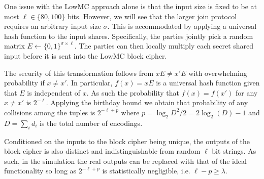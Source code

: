 One issue with the LowMC approach alone is that the input size is fixed to be at most $\ell\in\{80,100\}$ bits. However, we will see that the larger join protocol requires an arbitrary input size $\sigma$. This is accommodated by applying a universal hash function to the input shares. Specifically, the parties jointly pick a random matrix $E\gets\{0,1\}^{\sigma\times \ell}$. The parties can then locally multiply each secret shared input before it is sent into the LowMC block cipher.

The security of this transformation follows from $xE\neq x'E$ with overwhelming probability if $x\neq x'$. In particular, $f(x)=xE$ is a universal hash function given that $E$ is independent of $x$. As such the probability that $f(x)=f(x')$ for any $x\neq x'$  is $2^{-\ell}$. Applying the birthday bound we obtain that probability of any collisions among the tuples is $2^{-\ell+p}$ where $p=\log_2 D^2/2=2\log_2(D)-1$ and $D=\sum_i d_i$ is the total number of encodings.

Conditioned on the inputs to the block cipher being unique, the outputs of the block cipher is also distinct and indistinguishable from random $\ell$ bit strings. As such, in the simulation the real outputs can be replaced with that of the ideal functionality so long as $2^{-\ell+p}$ is statistically negligible, i.e. $\ell-p\geq\lambda$.




